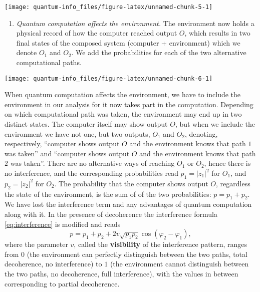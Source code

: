 \documentclass{article}
\providecommand{\tightlist}{%
  \setlength{\itemsep}{0pt}\setlength{\parskip}{0pt}}
\begin{document}
\begin{center}\texttt{[image: quantum-info\_files/figure-latex/unnamed-chunk-5-1]} \end{center}

\begin{enumerate}
\def\labelenumi{\arabic{enumi}.}
\setcounter{enumi}{1}
\tightlist
\item
  \emph{Quantum computation affects the environment.}
  The environment now holds a physical record of how the computer reached output \(O\), which results in two final states of the composed system (computer + environment) which we denote \(O_1\) and \(O_2\).
  We add the probabilities for each of the two alternative computational paths.
\end{enumerate}

\begin{center}\texttt{[image: quantum-info\_files/figure-latex/unnamed-chunk-6-1]} \end{center}

When quantum computation affects the environment, we have to include the environment in our analysis for it now takes part in the computation.
Depending on which computational path was taken, the environment may end up in two distinct states.
The computer itself may show output \(O\), but when we include the environment we have not one, but two outputs, \(O_1\) and \(O_2\), denoting, respectively, ``computer shows output \(O\) and the environment knows that path \(1\) was taken'' and ``computer shows output \(O\) and the environment knows that path \(2\) was taken''.
There are no alternative ways of reaching \(O_1\) or \(O_2\), hence there is no interference, and the corresponding probabilities read \(p_1=|z_1|^2\) for \(O_1\), and \(p_2=|z_2|^2\) for \(O_2\).
The probability that the computer shows output \(O\), regardless the state of the environment, is the sum of of the two probabilities: \(p=p_1+p_2\).
We have lost the interference term and any advantages of quantum computation along with it.
In the presence of decoherence the interference formula \eqref{eq:interference} is modified and reads
\[
p
= p_1 + p_2 + 2 v \sqrt{p_1 p_2}\cos (\varphi_2-\varphi_1),
\]
where the parameter \(v\), called the \textbf{visibility} of the interference pattern, ranges from \(0\) (the environment can perfectly distinguish between the two paths, total decoherence, no interference) to \(1\) (the environment cannot distinguish between the two paths, no decoherence, full interference), with the values in between corresponding to partial decoherence.
\end{document}
